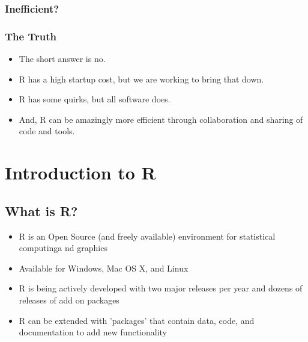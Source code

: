 \documentclass{beamer}
\begin{document}
{
\begin{frame}[plain]
\frametitle{Inefficient?}
\end{frame}
}


\begin{frame}
\frametitle{The Truth}
\begin{itemize}
   \item The short answer is no. 
   \pause
   \item R has a high startup cost, but we are working to bring that down. 
   \pause
   \item R has some quirks, but all software does.
   \pause
   \item And, R can be amazingly more efficient through collaboration and sharing of code and tools.
\end{itemize}
\end{frame}


\section{Introduction to R}
\label{sec:intro-r}

\subsection{What is R?}
\label{sec:what-r}


\begin{frame}
  \begin{itemize}
  \item R is an Open Source (and freely available) environment for statistical computinga nd graphics
  \item Available for Windows, Mac OS X, and Linux
  \item R is being actively developed with two major releases per year and dozens of releases of add on packages
  \item R can be extended with 'packages' that contain data, code, and documentation to add new functionality
  \end{itemize}
\end{frame}
\end{document}
